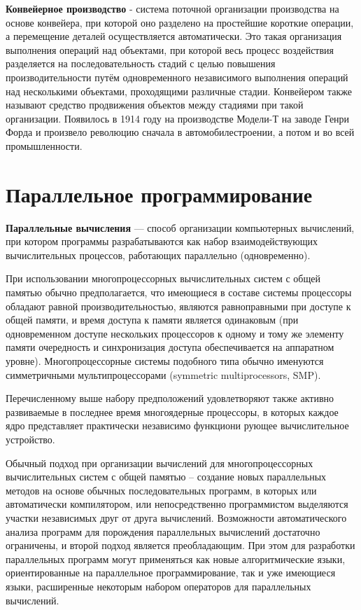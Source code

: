 \documentclass[12pt]{report}
\begin{document}
\textbf{Конвейерное производство} - система поточной организации производства на основе конвейера, при которой оно разделено на простейшие короткие операции, а перемещение деталей осуществляется автоматически. Это такая организация выполнения операций над объектами, при которой весь процесс воздействия разделяется на последовательность стадий с целью повышения производительности путём одновременного независимого выполнения операций над несколькими объектами, проходящими различные стадии. Конвейером также называют средство продвижения объектов между стадиями при такой организации\cite{wiki}. Появилось в 1914 году на производстве Модели-Т на заводе Генри Форда\cite{ford} и произвело революцию сначала в автомобилестроении, а потом и во всей промышленности.

\section{Параллельное программирование}
\textbf{Параллельные вычисления} — способ организации компьютерных вычислений, при котором программы разрабатываются как набор взаимодействующих вычислительных процессов, работающих параллельно (одновременно). 

При использовании многопроцессорных вычислительных систем с общей памятью обычно предполагается, что имеющиеся в составе системы процессоры обладают равной производительностью, являются равноправными при доступе к общей памяти, и время доступа к памяти является одинаковым (при одновременном доступе нескольких процессоров к одному и тому же элементу памяти очередность и синхронизация доступа обеспечивается на аппаратном уровне). Многопроцессорные системы подобного типа обычно именуются симметричными мультипроцессорами (symmetric multiprocessors, SMP).

Перечисленному выше набору предположений удовлетворяют также активно развиваемые в последнее время многоядерные процессоры, в которых каждое ядро представляет практически независимо функциони рующее вычислительное устройство.

Обычный подход при организации вычислений для многопроцессорных вычислительных систем с общей памятью – создание новых параллельных методов на основе обычных последовательных программ, в которых или автоматически компилятором, или непосредственно программистом выделяются участки независимых друг от друга вычислений. Возможности автоматического анализа программ для порождения параллельных вычислений достаточно ограничены, и второй подход является преобладающим. При этом для разработки параллельных программ могут применяться как новые алгоритмические языки, ориентированные на параллельное программирование, так и уже имеющиеся языки, расширенные некоторым набором операторов для параллельных вычислений.
\end{document}
